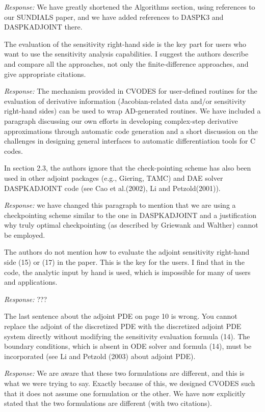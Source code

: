 {\em Response:}
We have greatly shortened the Algorithms section, using references to
our SUNDIALS paper, and we have added references to DASPK3 and
DASPKADJOINT there.

The evaluation of the sensitivity right-hand side is the key
part for users who want to use the sensitivity analysis
capabilities. I suggest the authors describe and compare all the
approaches, not only the finite-difference approaches, and give
appropriate citations. 

{\em Response:}
The mechanism provided in CVODES for user-defined routines
for the evaluation of derivative information (Jacobian-related data
and/or sensitivity right-hand sides) can be used to wrap AD-generated
routines.
We have included a paragraph discussing our own efforts 
in developing complex-step derivative approximations through automatic 
code generation and a short discussion on the challenges in 
designing general interfaces to automatic differentiation tools
for C codes.

In section 2.3, the authors ignore that the check-pointing
scheme has also been used in other adjoint packages (e.g.,
Giering, TAMC) and DAE solver DASPKADJOINT code (see Cao et
al.(2002), Li and Petzold(2001)). 

{\em Response:} 
we have changed this paragraph to mention that we are 
using a checkpointing scheme similar to the one in DASPKADJOINT
and a justification why truly optimal checkpointing (as described
by Griewank and Walther) cannot be employed.

The authors do not mention how to evaluate the adjoint sensitivity
right-hand side (15) or (17) in the paper. This is the key for the
users.  I find that in the code, the analytic input by hand is used,
which is impossible for many of users and applications.

{\em Response:} ???

The last sentence about the adjoint PDE on page 10 is wrong. 
You cannot replace the adjoint of the discretized PDE with the 
discretized adjoint PDE system directly without modifying the 
sensitivity evaluation formula (14). The boundary conditions, 
which is absent in ODE solver and formula (14), must be incorporated 
(see Li and Petzold (2003) about adjoint PDE). 

{\em Response:}
We are aware that these two formulations are different, and this is
what we were trying to say. Exactly because of this, we designed
CVODES such that it does not assume one formulation or the other.  We
have now explicitly stated that the two formulations are different
(with two citations).

